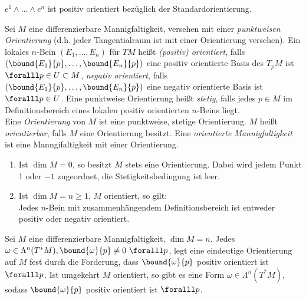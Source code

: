 \begin{exmp*}
	\( e^1 \wedge \dots \wedge e^n \) ist positiv orientiert bezüglich der Standardorientierung.
\end{exmp*}

\begin{defn}
	Sei $M$ eine differenzierbare Mannigfaltigkeit, versehen mit einer \emph{punktweisen Orientierung} (d.h. jeder Tangentialraum ist mit einer Orientierung versehen). Ein lokales $n$-Bein \( (E_1, \dotsc, E_n) \) für $TM$ heißt \emph{(positiv) orientiert}, falls \( \left( \bound{E_1}{p}, \dotsc, \bound{E_n}{p} \right) \) eine positiv orientierte Basis des $T_pM$ ist $\foralll p \in U \subset M$, \emph{negativ orientiert}, falls \( \left( \bound{E_1}{p}, \dotsc, \bound{E_n}{p} \right) \) eine negativ orientierte Basis ist $\foralll p \in U$. Eine punktweise Orientierung heißt \emph{stetig}, falls jedes $p \in M$ im Definitionsbereich eines lokalen positiv orientierten $n$-Beins liegt.\\
	Eine \emph{Orientierung} von $M$ ist eine punktweise, stetige Orientierung. $M$ heißt \emph{orientierbar}, falls $M$ eine Orientierung besitzt. Eine \emph{orientierte Mannigfaltigkeit} ist eine Manngifaltigkeit mit einer Orientierung.
\end{defn}

\begin{rem}
	\begin{enumerate}[label={\roman*})]
		\item Ist \( \dim M = 0 \), so besitzt $M$ stets eine Orientierung. Dabei wird jedem Punkt 1 oder $-1$ zugeordnet, die Stetigkeitsbedingung ist leer.
		\item Ist $\dim M = n \geq 1$, $M$ orientiert, so gilt:\\
			Jedes $n$-Bein mit zusammenhängendem Definitionsbereich ist entweder positiv oder negativ orientiert.
	\end{enumerate}
\end{rem}

\begin{lem}
	Sei $M$ eine differenzierbare Mannigfaltigkeit, $\dim M = n$. Jedes $\omega \in \Lambda^n(T^*M), \bound{\omega}{p} \neq 0 \ \foralll p$, legt eine eindeutige Orientierung auf $M$ fest durch die Forderung, dass \( \bound{\omega}{p} \) positiv orientiert ist $\foralll p$. Ist umgekehrt $M$ orientiert, so gibt es eine Form $\omega \in \Lambda^n(T^*M)$, sodass \( \bound{\omega}{p} \) positiv orientiert ist $\foralll p$.
\end{lem}


